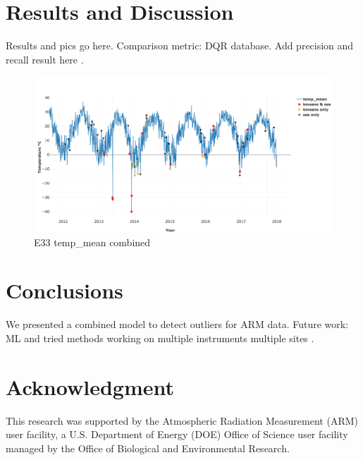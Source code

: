\documentclass[letterpaper, 10 pt, conference]{ieeeconf}  %
\begin{document}
\section{Results and Discussion}
Results and pics go here. Comparison metric: DQR database. Add precision and 
recall result here \cite{perry1955machine}.
\begin{figure}[ht]
    \centering
    \includegraphics[width=\textwidth]{combined.png}
    \caption{E33 temp\_mean combined}
    \label{fig:combined}
\end{figure}

\section{Conclusions}
We presented a combined model to detect outliers for ARM data. Future work: 
ML and tried methods working on multiple instruments multiple sites \cite{phillips2015graph}.


\section*{Acknowledgment}
This research was supported by the Atmospheric Radiation Measurement (ARM) user 
facility, a U.S. Department of Energy (DOE) Office of Science user facility 
managed by the Office of Biological and Environmental Research.


 

\end{document}
